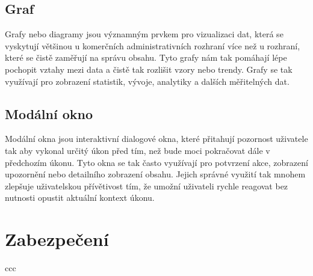 \subsection{Graf}
\label{subsec:admin-tags-chart}
Grafy nebo diagramy jsou významným prvkem pro vizualizaci dat, která se vyskytují většinou u komerčních administrativních rozhraní více než u rozhraní, které se čistě zaměřují na správu obsahu. Tyto grafy nám tak pomáhají lépe pochopit vztahy mezi data a čistě tak rozlišit vzory nebo trendy. Grafy se tak využívají pro zobrazení statistik, vývoje, analytiky a dalších měřitelných dat.

\subsection{Modální okno}
\label{subsec:admin-tags-modal}
Modální okna jsou interaktivní dialogové okna, které přitahují pozornost uživatele tak aby vykonal určitý úkon před tím, než bude moci pokračovat dále v předchozím úkonu. Tyto okna se tak často využívají pro potvrzení akce, zobrazení upozornění nebo detailního zobrazení obsahu. Jejich správné využití tak mnohem zlepšuje uživatelskou přívětivost tím, že umožní uživateli rychle reagovat bez nutnosti opustit aktuální kontext úkonu.

\section{Zabezpečení}
\label{sec:security}
ccc